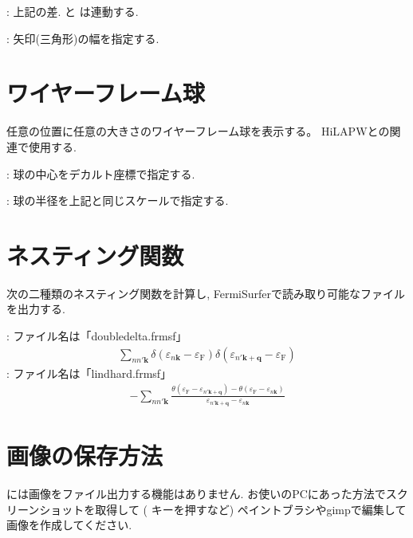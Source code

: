 \documentclass[letterpaper,10pt,dvipdfmx,openany]{sphinxmanual}
\begin{document}
\sphinxAtStartPar
{} : 上記の差.  と  は連動する.

\sphinxAtStartPar
{} : 矢印(三角形)の幅を指定する.


\section{ワイヤーフレーム球}
\label{\detokenize{ops:id20}}
\sphinxAtStartPar
任意の位置に任意の大きさのワイヤーフレーム球を表示する。
HiLAPWとの関連で使用する.

\sphinxAtStartPar
{} : 球の中心をデカルト座標で指定する.

\sphinxAtStartPar
{} : 球の半径を上記と同じスケールで指定する.


\section{ネスティング関数}
\label{\detokenize{ops:id21}}
\sphinxAtStartPar
次の二種類のネスティング関数を計算し, FermiSurferで読み取り可能なファイルを出力する.

\sphinxAtStartPar
{} : ファイル名は「doubledelta.frmsf」
\begin{equation*}
\begin{split}\sum_{n n' \textbf{k}} \delta(\varepsilon_{n \textbf{k}}-\varepsilon_\textrm{F})
\delta(\varepsilon_{n' \textbf{k}+\textbf{q}}-\varepsilon_\textrm{F})\end{split}
\end{equation*}
\sphinxAtStartPar
{} :  ファイル名は「lindhard.frmsf」
\begin{equation*}
\begin{split}-\sum_{n n' \textbf{k}} \frac{\theta(\varepsilon_\textrm{F} - \varepsilon_{n' \textbf{k}+\textbf{q}})
-\theta(\varepsilon_\textrm{F}-\varepsilon_{n \textbf{k}})}
{\varepsilon_{n' \textbf{k}+\textbf{q}} - \varepsilon_{n \textbf{k}}}\end{split}
\end{equation*}

\section{画像の保存方法}
\label{\detokenize{ops:id22}}
\sphinxAtStartPar
{} には画像をファイル出力する機能はありません.
お使いのPCにあった方法でスクリーンショットを取得して
( キーを押すなど)
ペイントブラシやgimpで編集して画像を作成してください.
\end{document}
